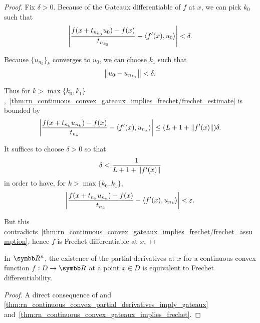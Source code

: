 \begin{proof}
  Fix \( \delta > 0 \). Because of the Gateaux differentiable of \( f \) at \( x \), we can pick \( k_0 \) such that
  \begin{equation*}
    \left\vert \frac {f(x + t_{n_{k_0}} u_0) - f(x)} {t_{n_{k_0}}} - \left\langle f'(x), u_0 \right\rangle \right\vert < \delta.
  \end{equation*}

  Because \( \{ u_{n_k} \}_k \) converges to \( u_0 \), we can choose \( k_1 \) such that
  \begin{equation*}
    \left\Vert u_0 - u_{n_{k_1}} \right\Vert < \delta.
  \end{equation*}

  Thus for \( k > \max \{ k_0, k_1 \} \),~\cref{thm:rn_continuous_convex_gateaux_implies_frechet/frechet_estimate} is bounded by
  \begin{align*}
    \left\vert \frac {f(x + t_{n_k} u_{n_k}) - f(x)} {t_{n_k}} - \left\langle f'(x), u_{n_k} \right\rangle \right\vert
    \leq
    (L + 1 + \left\Vert f'(x) \right\Vert) \delta.
  \end{align*}

  It suffices to choose \( \delta > 0 \) so that
  \begin{equation*}
    \delta < \frac 1 {L + 1 + \left\Vert f'(x) \right\Vert}
  \end{equation*}
  in order to have, for \( k > \max \{ k_0, k_1 \} \),
  \begin{equation*}
    \left\vert \frac {f(x + t_{n_k} u_{n_k}) - f(x)} {t_{n_k}} - \left\langle f'(x), u_{n_k} \right\rangle \right\vert < \varepsilon.
  \end{equation*}

  But this contradicts~\cref{thm:rn_continuous_convex_gateaux_implies_frechet/frechet_assumption}, hence \( f \) is Frechet differentiable at \( x \).
\end{proof}

\begin{corollary}\label{thm:rn_continuous_convex_partial_derivatives_imply_frechet}
  In \( \R^n \), the existence of the partial derivatives at \( x \) for a continuous convex function \( f: D \to \R \) at a point \( x \in D \) is equivalent to Frechet differentiability.
\end{corollary}
\begin{proof}
  A direct consequence of and \cref{thm:rn_continuous_convex_partial_derivatives_imply_gateaux} and~\cref{thm:rn_continuous_convex_gateaux_implies_frechet}.
\end{proof}

